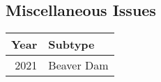 \documentclass[
  landscape]{article}
\begin{document}
\hypertarget{miscellaneous-issues}{%
\subsection{Miscellaneous Issues}\label{miscellaneous-issues}}

\begin{longtable}[]{@{}rl@{}}
\toprule()
Year & Subtype \\
\midrule()
\endhead
2021 & Beaver Dam \\
\bottomrule()
\end{longtable}
\end{document}
